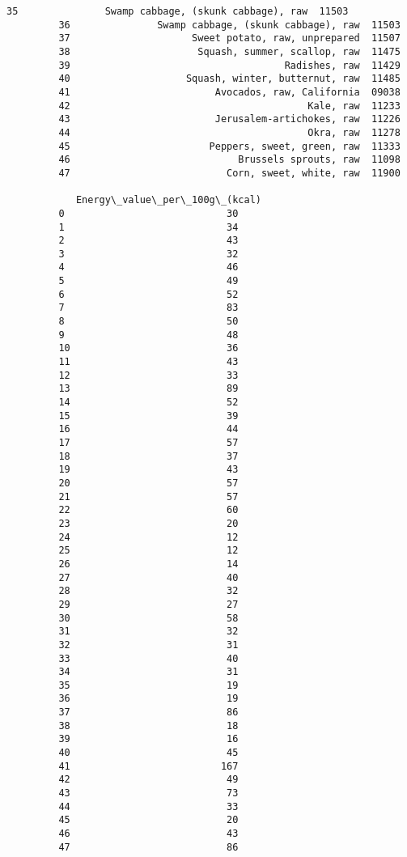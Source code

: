 \documentclass[11pt]{article}
\begin{document}
\begin{Verbatim}[commandchars=\\\{\}]
         35               Swamp cabbage, (skunk cabbage), raw  11503   
         36               Swamp cabbage, (skunk cabbage), raw  11503   
         37                     Sweet potato, raw, unprepared  11507   
         38                      Squash, summer, scallop, raw  11475   
         39                                     Radishes, raw  11429   
         40                    Squash, winter, butternut, raw  11485   
         41                         Avocados, raw, California  09038   
         42                                         Kale, raw  11233   
         43                         Jerusalem-artichokes, raw  11226   
         44                                         Okra, raw  11278   
         45                        Peppers, sweet, green, raw  11333   
         46                             Brussels sprouts, raw  11098   
         47                           Corn, sweet, white, raw  11900   
         
            Energy\_value\_per\_100g\_(kcal)  
         0                            30  
         1                            34  
         2                            43  
         3                            32  
         4                            46  
         5                            49  
         6                            52  
         7                            83  
         8                            50  
         9                            48  
         10                           36  
         11                           43  
         12                           33  
         13                           89  
         14                           52  
         15                           39  
         16                           44  
         17                           57  
         18                           37  
         19                           43  
         20                           57  
         21                           57  
         22                           60  
         23                           20  
         24                           12  
         25                           12  
         26                           14  
         27                           40  
         28                           32  
         29                           27  
         30                           58  
         31                           32  
         32                           31  
         33                           40  
         34                           31  
         35                           19  
         36                           19  
         37                           86  
         38                           18  
         39                           16  
         40                           45  
         41                          167  
         42                           49  
         43                           73  
         44                           33  
         45                           20  
         46                           43  
         47                           86  
\end{Verbatim}
            
\end{document}

